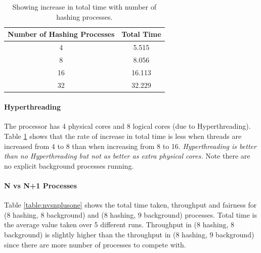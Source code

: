 \documentclass[10pt] {article}
\begin{document}
\begin{table}
\centering
\begin{tabular}{ |c|c| } 
 \hline
\textbf{Number of Hashing Processes} & \textbf{Total Time} \\
\hline
4 & 5.515 \\ 
\hline
8 & 8.056\\
\hline
16 & 16.113\\
\hline
32 & 32.229\\
\hline
\end{tabular}
\caption{Showing increase in total time with number of hashing processes.}
 \label{table:hyperthrd}
\end{table}


\paragraph{Hyperthreading}
The processor has 4 physical cores and 8 logical cores (due to Hyperthreading). Table \ref{table:hyperthrd} shows that the rate of increase in total time is less when threads are increased from 4 to 8 than when increasing from 8 to 16. \emph{Hyperthreading is better than no Hyperthreading but not as better as extra physical cores.} Note there are no explicit background processes running.





\paragraph{N vs N+1 Processes}

Table \ref{table:nvsnplusone} shows the total time taken, throughput and fairness for (8 hashing, 8 background) and (8 hashing, 9 background) processes. Total time is the average value taken over 5 different runs. Throughput in (8 hashing, 8 background) is slightly higher than the throughput in (8 hashing, 9 background) since there are more number of processes to compete with.
\end{document}
